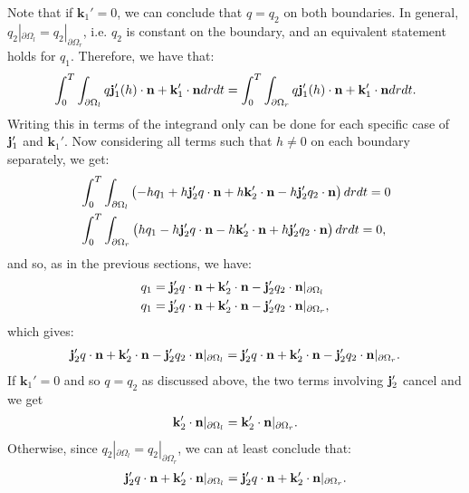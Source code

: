 	Note that if $\mathbf{k}_1' = 0$, we can conclude that $q = q_2$ on both boundaries.
	In general, $q_2|_{\partial \Omega_l} = q_2|_{\partial \Omega_r}$, i.e. $q_2$ is constant on the boundary, and an equivalent statement holds for $q_1$. Therefore, we have that:
	\begin{align*}
		\int_0^T \int_{\partial \Omega_l}  q \mathbf j_1'(h)   \cdot \mathbf{n}  +\mathbf{k}_1' \cdot \mathbf{n}   dr dt = \int_0^T \int_{\partial \Omega_r} q \mathbf j_1'(h)   \cdot \mathbf{n}  +  \mathbf{k}_1' \cdot \mathbf{n}  dr dt .
	\end{align*}
	Writing this in terms of the integrand only can be done for each specific case of $\mathbf j_1'$ and $\mathbf{k}_1'$. 
	Now considering all terms such that $h \neq 0$ on each boundary separately, we get:
	\begin{align*}
		&\int_0^T \int_{\partial \Omega_l} \left(- h q_1  + h \mathbf j'_2 q \cdot \mathbf{n} + h\mathbf{k}_2' \cdot \mathbf{n}-  h \mathbf j'_2 q_2 \cdot \mathbf{n} \right)   dr  dt =0 \\
		&\int_0^T \int_{\partial \Omega_r} \left( h q_1  - h \mathbf j'_2 q \cdot \mathbf{n} - h\mathbf{k}_2' \cdot \mathbf{n} + h \mathbf j'_2 q_2 \cdot \mathbf{n} \right)   dr  dt =0 ,
	\end{align*}
	and so, as in the previous sections, we have:
	\begin{align*}
		q_1 &=   \mathbf j'_2 q \cdot \mathbf{n} + \mathbf{k}_2' \cdot \mathbf{n} - \mathbf j'_2 q_2 \cdot \mathbf{n} |_{\partial \Omega_l} \\
		q_1 &=  \mathbf j'_2 q \cdot \mathbf{n} + \mathbf{k}_2' \cdot \mathbf{n} -\mathbf j'_2 q_2 \cdot \mathbf{n} |_{\partial \Omega_r}, 
	\end{align*}
	which gives:
	\begin{align*}
		\mathbf j'_2 q \cdot \mathbf{n} +  \mathbf{k}_2' \cdot \mathbf{n} - \mathbf j'_2 q_2 \cdot \mathbf{n} |_{\partial \Omega_l} =  \mathbf j'_2 q \cdot \mathbf{n} + \mathbf{k}_2' \cdot \mathbf{n} - \mathbf j'_2 q_2 \cdot \mathbf{n} |_{\partial \Omega_r}.
	\end{align*}
	If $\mathbf{k}_1' = 0$ and so $q = q_2$ as discussed above, the two terms involving $\mathbf j_2'$ cancel and we get
	\begin{align*}
		\mathbf{k}_2' \cdot \mathbf{n}  |_{\partial \Omega_l} =   \mathbf{k}_2' \cdot \mathbf{n}  |_{\partial \Omega_r}.
	\end{align*}
	Otherwise, since $q_2|_{\partial \Omega_l} = q_2|_{\partial \Omega_r}$, we can at least conclude that:
	\begin{align*}
		\mathbf j'_2 q \cdot \mathbf{n} + \mathbf{k}_2' \cdot \mathbf{n}  |_{\partial \Omega_l} =  \mathbf j'_2 q \cdot \mathbf{n} + \mathbf{k}_2' \cdot \mathbf{n}  |_{\partial \Omega_r}.
	\end{align*}
	\\
